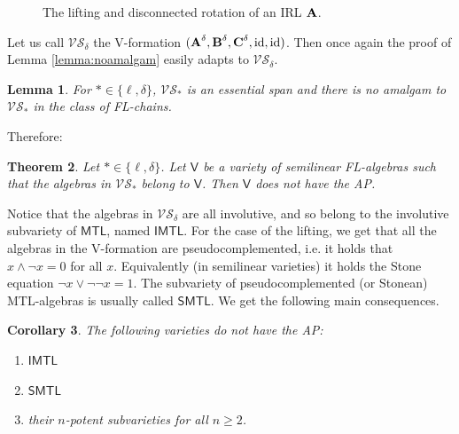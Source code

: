 \documentclass{amsart}
\newtheorem{theorem}{Theorem}[section]
\newtheorem{lemma}[theorem]{Lemma}
\newtheorem{corollary}[theorem]{Corollary}
\theoremstyle{definition}
\numberwithin{equation}{section}
\newcommand{\alg}[1]{{\textbf{\upshape #1}}}  %
\newcommand{\vv}[1]{\mathsf {#1}}
\newcommand{\VS}{\mathcal{VS}}
\begin{document}
 \begin{figure}
\begin{center}
\end{center} \caption{The lifting and disconnected rotation of an IRL $\alg A$.} \label{fig:rotation}
 \end{figure}
Let us call $\VS_\delta$ the V-formation $(\alg A^\delta, \alg B^\delta, \alg C^\delta, {\rm id}, {\rm id})$. Then once again the proof of Lemma \ref{lemma:noamalgam} easily adapts to $\VS_\delta$. 
\begin{lemma}
For $* \in \{\ell, \delta\}$, $\VS_*$ is an essential span and there is no amalgam to $\VS_*$ in the class of FL-chains.
\end{lemma}
Therefore:
\begin{theorem}
 Let $* \in \{\ell, \delta\}$.
	Let $\vv V$ be a variety of semilinear FL-algebras such that the algebras in $\VS_*$ belong to $\vv V$. Then $\vv V$ does not have the AP. 
\end{theorem}
Notice that the algebras in $\VS_\delta$ are all involutive, and so belong to the involutive subvariety of $\vv{MTL}$, named $\vv{IMTL}$. For the case of the lifting, we get that all the algebras in the V-formation are pseudocomplemented, i.e. it holds that $x \land \neg x = 0$ for all $x$. Equivalently (in semilinear varieties) it holds the Stone equation $\neg x \lor \neg \neg x = 1$. The subvariety of pseudocomplemented (or Stonean) MTL-algebras is usually called $\vv{SMTL}$.
We get the following main consequences.
\begin{corollary}
	The following varieties do not have the AP:
	\begin{enumerate}
		\item $\mathsf{IMTL}$
		\item $\mathsf{SMTL}$
		\item their $n$-potent subvarieties for all $n \geq 2$.
	\end{enumerate} 
\end{corollary}
\end{document}

